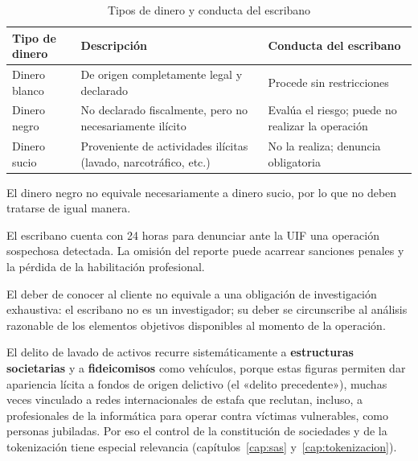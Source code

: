 \documentclass[12pt,oneside]{book}
\begin{document}
\begin{table}[H]
\centering
\caption{Tipos de dinero y conducta del escribano}
\renewcommand{\arraystretch}{1.2}
\begin{tabularx}{\textwidth}{>{\raggedright\arraybackslash}X>{\raggedright\arraybackslash}X>{\raggedright\arraybackslash}X}
\toprule
\textbf{Tipo de dinero} & \textbf{Descripción} & \textbf{Conducta del escribano} \\
\midrule
Dinero blanco & De origen completamente legal y declarado & Procede sin restricciones \\
Dinero negro & No declarado fiscalmente, pero no necesariamente ilícito & Evalúa el riesgo; puede no realizar la operación \\
Dinero sucio & Proveniente de actividades ilícitas (lavado, narcotráfico, etc.) & No la realiza; denuncia obligatoria \\
\bottomrule
\end{tabularx}
\end{table}

El dinero negro no equivale necesariamente a dinero sucio, por lo que no deben tratarse de igual manera.

\begin{important}
El escribano cuenta con 24 horas para denunciar ante la UIF una operación sospechosa detectada. La omisión del reporte puede acarrear sanciones penales y la pérdida de la habilitación profesional.
\end{important}

\begin{note}
El deber de conocer al cliente no equivale a una obligación de investigación exhaustiva: el escribano no es un investigador; su deber se circunscribe al análisis razonable de los elementos objetivos disponibles al momento de la operación.
\end{note}

El delito de lavado de activos recurre sistemáticamente a \textbf{estructuras societarias} y a \textbf{fideicomisos} como vehículos, porque estas figuras permiten dar apariencia lícita a fondos de origen delictivo (el «delito precedente»), muchas veces vinculado a redes internacionales de estafa que reclutan, incluso, a profesionales de la informática para operar contra víctimas vulnerables, como personas jubiladas. Por eso el control de la constitución de sociedades y de la tokenización tiene especial relevancia (capítulos~\ref{cap:sas} y~\ref{cap:tokenizacion}).
\end{document}
